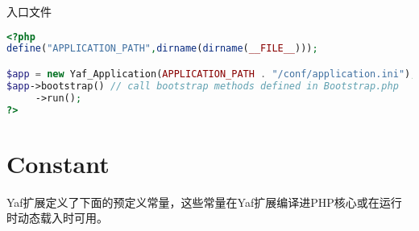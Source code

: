\begin{example}
入口文件
\begin{lstlisting}[language=PHP]
<?php
define("APPLICATION_PATH",dirname(dirname(__FILE__)));

$app = new Yaf_Application(APPLICATION_PATH . "/conf/application.ini");
$app->bootstrap() // call bootstrap methods defined in Bootstrap.php
     ->run();
?>
\end{lstlisting}
\end{example}





\section{Constant}

Yaf扩展定义了下面的预定义常量，这些常量在Yaf扩展编译进PHP核心或在运行时动态载入时可用。

